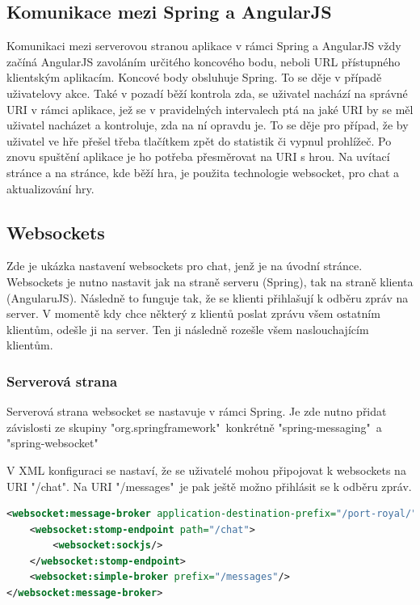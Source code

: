 \documentclass[czech,master,public,dept460,male,cpdeclaration,twoside]{diploma}
\begin{document}
\subsection{Komunikace mezi Spring a AngularJS}
Komunikaci mezi serverovou stranou aplikace v rámci Spring a AngularJS vždy začíná AngularJS zavoláním určitého koncového bodu, neboli URL přístupného klientským aplikacím. Koncové body obsluhuje Spring. To se děje v případě uživatelovy akce. Také v pozadí běží kontrola zda, se uživatel nachází na správné URI v rámci aplikace, jež se v pravidelných intervalech ptá na jaké URI by se měl uživatel nacházet a kontroluje, zda na ní opravdu je. To se děje pro případ, že by uživatel ve hře přešel třeba tlačítkem zpět do statistik či vypnul prohlížeč. Po znovu spuštění aplikace je ho potřeba přesměrovat na URI s hrou. Na uvítací stránce a na stránce, kde běží hra, je použita technologie websocket, pro chat a aktualizování hry.

\subsection{Websockets}
Zde je ukázka nastavení websockets pro chat, jenž je na úvodní stránce. Websockets je nutno nastavit jak na straně serveru (Spring), tak na straně klienta (AngularuJS). Následně to funguje tak, že se klienti přihlašují k odběru zpráv na server. V momentě kdy chce některý z klientů poslat zprávu všem ostatním klientům, odešle ji na server. Ten ji následně rozešle všem naslouchajícím klientům.

\subsubsection{Serverová strana}
Serverová strana websocket se nastavuje v rámci Spring. Je zde nutno přidat závislosti ze skupiny "org.springframework"~konkrétně "spring-messaging"~a "spring-websocket"

V XML konfiguraci se nastaví, že se uživatelé mohou připojovat k websockets na URI "/chat". Na URI "/messages"~je pak ještě možno přihlásit se k odběru zpráv.\\
\begin{lstlisting}[language=XML, caption=XML konfigurace websockets]
<websocket:message-broker application-destination-prefix="/port-royal/">
    <websocket:stomp-endpoint path="/chat">
        <websocket:sockjs/>
    </websocket:stomp-endpoint>
    <websocket:simple-broker prefix="/messages"/>
</websocket:message-broker>
\end{lstlisting}
\end{document}
